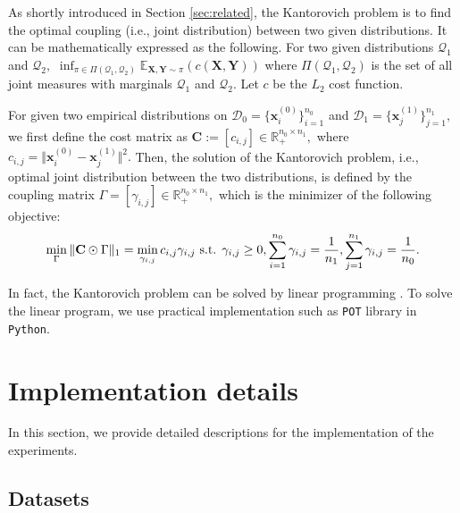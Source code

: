 \documentclass[10pt]{article} %
\begin{document}
As shortly introduced in Section \ref{sec:related}, the Kantorovich problem is to find the optimal coupling (i.e., joint distribution) between two given distributions.
It can be mathematically expressed as the following.
For two given distributions $\mathcal{Q}_{1}$ and $\mathcal{Q}_{2},$
$
\inf_{\pi \in \Pi(\mathcal{Q}_{1}, \mathcal{Q}_{2})} \mathbb{E}_{\mathbf{X}, \mathbf{Y} \sim \pi} \left( c(\mathbf{X}, \mathbf{Y}) \right)
$ 
where $\Pi(\mathcal{Q}_{1}, \mathcal{Q}_{2})$ is the set of all joint measures with marginals $\mathcal{Q}_{1}$ and $\mathcal{Q}_{2}.$
Let $c$ be the $L_{2}$ cost function.

For given two empirical distributions on $\mathcal{D}_{0} = \{ \mathbf{x}_{i}^{(0)} \}_{i=1}^{n_{0}}$ and $\mathcal{D}_{1} = \{ \mathbf{x}_{j}^{(1)}\}_{j=1}^{n_{1}},$
we first define the cost matrix as
$\mathbf{C} := [c_{i, j}] \in \mathbb{R}_{+}^{n_{0} \times n_{1}},$ where $ c_{i, j} = \Vert \mathbf{x}_{i}^{(0)} - \mathbf{x}_{j}^{(1)} \Vert^{2}.$
Then, the solution of the Kantorovich problem, i.e., optimal joint distribution between the two distributions, is defined by the coupling matrix $\Gamma = [\gamma_{i, j}] \in \mathbb{R}_{+}^{n_{0} \times n_{1}},$ which is the minimizer of the following objective:
\begin{equation}
    \min_{\Gamma} \Vert \mathbf{C} \odot \Gamma \Vert_{1}
    = \min_{\gamma_{i, j}} c_{i, j} \gamma_{i, j}
    \textup{ s.t. }
    \gamma_{i, j} \ge 0,
    \sum_{i=1}^{n_{0}} \gamma_{i, j} = \frac{1}{n_{1}},
    \sum_{j=1}^{n_{1}} \gamma_{i, j} = \frac{1}{n_{0}}.
\end{equation}

In fact, the Kantorovich problem can be solved by linear programming \citep{Kantorovich2006OnTT, villani2008optimal}.
To solve the linear program, we use practical implementation such as \texttt{POT} library in \texttt{Python}.



\clearpage
\section{Implementation details}\label{appendix:D}

In this section, we provide detailed descriptions for the implementation of the experiments.

\subsection{Datasets}\label{sec:datasets-appendix}
\end{document}
